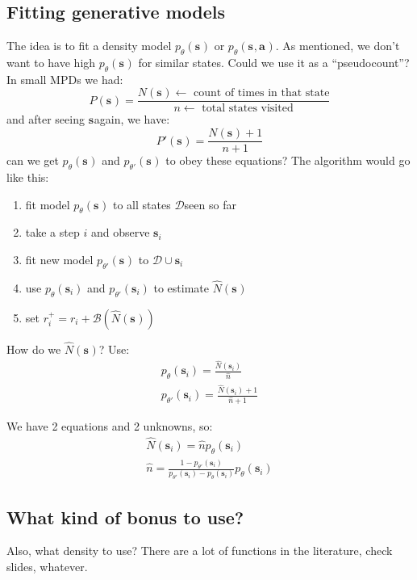 \documentclass{report}
\begin{document}
\subsection{Fitting generative models}
The idea is to fit a density model $ p_\theta(\bm{s}_{})  $ or $ p_\theta (\bm{s}_{}, \bm{a}_{})  $.
As mentioned, we don't want to have high $ p_\theta(\bm{s}_{})  $ for similar states.
Could we use it as a ``pseudocount''?
In small MPDs we had:
\begin{equation}
		P\left( \bm{s}_{} \right) = \frac{N(\bm{s}_{}) \leftarrow \text{ count of times in that state}}{n \leftarrow \text{ total states visited}} 
\end{equation}
and after seeing $ \bm{s}_{}  $again, we have:
\begin{equation}
		P'\left( \bm{s}_{} \right) = \frac{N(\bm{s}_{}) +1 }{n  +1 } 
\end{equation}
can we get $ p_\theta(\bm{s}_{})  $ and $ p_{\theta'}(\bm{s}_{})  $ to obey these equations?
The algorithm would go like this:
\begin{enumerate}
		\item fit model $ p_{\theta}(\bm{s}_{})  $ to all states $ \mathcal{D}  $seen so far
		\item take a step $i$ and observe $ \bm{s}_{i}  $
		\item fit new model $ p_{\theta'}(\bm{s}_{})  $ to $ \mathcal{D}  \cup \bm{s}_{i}$ 
		\item use $ p_{\theta}(\bm{s}_{i})  $ and $ p_{\theta'}(\bm{s}_{i})  $ to estimate $ \hat{N}(\bm{s}_{})  $
		\item set $ r^+_i = r_i + \mathcal{B}(\hat{N}(\bm{s}_{}))  $
\end{enumerate}
How do we $ \hat{ N}(\bm{s}_{})$?
Use:
\begin{gather}
		p_\theta(\bm{s}_{i}) = \frac{\hat{N}(\bm{s}_{i})}{\hat{n}} \\
		p_{\theta'}(\bm{s}_{i}) = \frac{\hat{N}(\bm{s}_{i})+1}{\hat{n}+1} 
\end{gather}

We have 2 equations and 2 unknowns, so:
\begin{gather}
		\hat{N}(\bm{s}_{i}) = \hat{n}p_{\theta}(\bm{s}_{i}) \\
		\hat{n} = \frac{1 - p_{\theta'}(\bm{s}_{i})}{p_{\theta'}(\bm{s}_{i}) - p_{\theta}(\bm{s}_{i})} p_{\theta}(\bm{s}_{i})
\end{gather}

\subsection{What kind of bonus to use?}
Also, what density to use?
There are a lot of functions in the literature, check slides, whatever.
\end{document}
